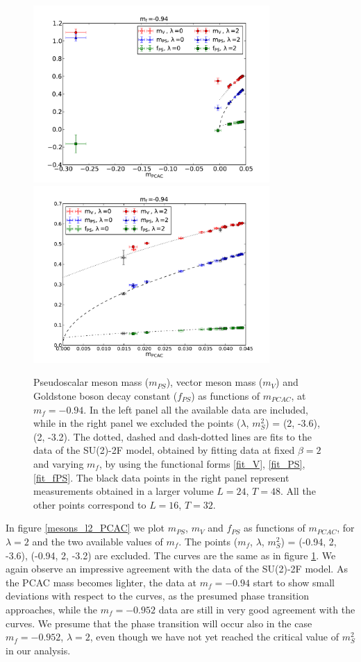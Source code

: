 \begin{figure}[thb] 
\begin{adjustwidth}{-4em}{-4em}
  \includegraphics[width=9cm,clip]{pics/mesons_094_PCAC} ~\includegraphics[width=9cm,clip]{pics/mesons_094_PCAC_fit}
   \end{adjustwidth}
  \caption{Pseudoscalar meson mass ($m_{PS}$), vector meson mass ($m_V$) and Goldstone boson decay constant ($f_{PS}$) as functions of $m_{PCAC}$, at $m_f = -0.94$. In the left panel all the available data are included, while in the right panel we excluded the points ($\lambda$, $m_S^2$) = (2, -3.6), (2, -3.2). The dotted, dashed and dash-dotted lines are fits to the data of the SU(2)-2F model, obtained by fitting data at fixed $\beta = 2$ and varying $m_f$, by using the functional forms \ref{fit_V}, \ref{fit_PS}, \ref{fit_fPS}. The black data points in the right panel represent measurements obtained in a larger volume $L=24$, $T=48$. All the other points correspond to $L=16$, $T=32$.}
  \label{mesons_094_PCAC} 
\end{figure}


In figure \ref{mesons_l2_PCAC} we plot $m_{PS}$, $m_V$ and $f_{PS}$ as functions of $m_{PCAC}$, for $\lambda = 2$ and the two available values of $m_f$. The points ($m_f$, $\lambda$, $m_S^2$) = (-0.94, 2, -3.6), (-0.94, 2, -3.2) are excluded. The curves are the same as in figure \ref{mesons_094_PCAC}. We again observe an impressive agreement with the data of the SU(2)-2F model. As the PCAC mass becomes lighter, the data at $m_f = -0.94$ start to show small deviations with respect to the curves, as the presumed phase transition approaches, while the $m_f = -0.952$ data are still in very good agreement with the curves. We presume that the phase transition will occur also in the case $m_f = -0.952$, $\lambda = 2$, even though we have not yet reached the critical value of $m_S^2$ in our analysis.



